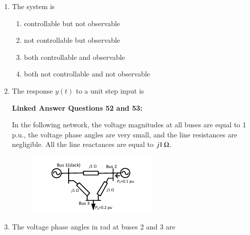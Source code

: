 \documentclass[journal,12pt,onecolumn]{IEEEtran}
\theoremstyle{remark}
\begin{document}
\begin{enumerate}
\item The system is
\begin{enumerate}

\item controllable but not observable
\item not controllable but observable
\item both controllable and observable
\item both not controllable and not observable
\end{enumerate}

\item The response $y(t)$ to a unit step input is
\begin{enumerate}
\end{enumerate}


\textbf{Linked Answer Questions 52 and 53:}

 In the following network, the voltage magnitudes at all buses are equal to 1 p.u., the voltage phase angles are very small, and the line resistances are negligible. All the line reactances are equal to $j1\,\ohm$.

\begin{figure}[H]
    \centering
    \includegraphics[width=0.5\columnwidth]{figs/23.png}
    \label{fig:placeholder}
\end{figure}

\item The voltage phase angles in rad at buses 2 and 3 are
\begin{enumerate}
\end{enumerate}


\end{enumerate}
\end{document}
